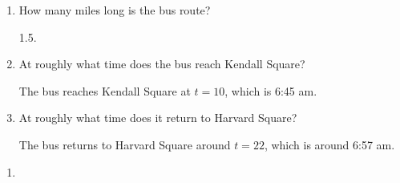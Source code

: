 \documentclass{article}
\begin{document}
\begin{enumerate}
  \parbox[t]{2.75in}{
    \vspace{0pt}
  }
  \begin{minipage}[t]{1.0\linewidth-2.85in}
    \begin{enumerate}
    \item
      \begin{problem}[0.35in]
        How many miles long is the bus route?
      \end{problem}

      \begin{solution}
        1.5. 
      \end{solution}

    \item
      \begin{problem}[0.35in]
        At roughly what time does the bus reach Kendall Square?
      \end{problem}

      \begin{solution}
        The bus reaches Kendall Square at $t = 10$, which is 6:45 am.  
      \end{solution}

    \item
      \begin{problem}
        At roughly what time does it return to Harvard Square?
      \end{problem}

      \begin{solution}
        The bus returns to Harvard Square around $t = 22$, which is
        around 6:57 am.
      \end{solution}

    \end{enumerate}

  \end{minipage}

  \begin{enumerate}[start=4]
  \item \label{68-bus-route-velocity}


\end{enumerate}
\end{enumerate}
\end{document}
